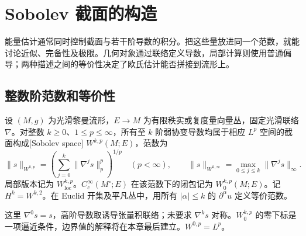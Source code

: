 
% 
% 

\section{Sobolev 截面的构造}
\label{g3:sec:1102}

能量估计通常同时控制截面与若干阶导数的积分。把这些量放进同一个范数，就能讨论近似、完备性及极限。几何对象通过联络定义导数，局部计算则使用普通偏导；两种描述之间的等价性决定了欧氏估计能否拼接到流形上。

\subsection{整数阶范数和等价性}
\label{g3:subsec:1102:01}
\begin{definition}\label{g3:def:sobolev-sections}
	设 \((M,g)\) 为光滑黎曼流形，\(E\to M\) 为有限秩实或复度量向量丛，固定光滑联络 \(\nabla\)。对整数 \(k\ge0\)、\(1\le p\le\infty\)，所有至 \(k\) 阶弱协变导数均属于相应 \(L^p\) 空间的截面构成[Sobolev space] \(W^{k,p}(M;E)\)，范数为
	\begin{equation}\label{g3:eq:sobolev-norm}
		\|s\|_{W^{k,p}}=
		\left(\sum_{j=0}^k\|\nabla^j s\|_p^p\right)^{1/p}\quad(p<\infty),
		\qquad \|s\|_{W^{k,\infty}}=\max_{0\le j\le k}\|\nabla^js\|_\infty.
	\end{equation}
	局部版本记为 \(W^{k,p}_{\mathrm{loc}}\)。\(C_c^\infty(M^\circ;E)\) 在该范数下的闭包记为 \(W^{k,p}_0(M;E)\)。记 \(H^k=W^{k,2}\)。在 Euclid 开集及平凡丛中，用所有 \(|\alpha|\le k\) 的 \(\partial^\alpha u\) 定义等价范数。
\end{definition}

这里 \(\nabla^0s=s\)，高阶导数取诱导张量积联络；未要求 \(\nabla^ks\) 对称。\(W^{k,p}_0\) 的零下标是一项逼近条件，边界值的解释将在本章最后建立。\(W^{0,p}=L^p\)。

